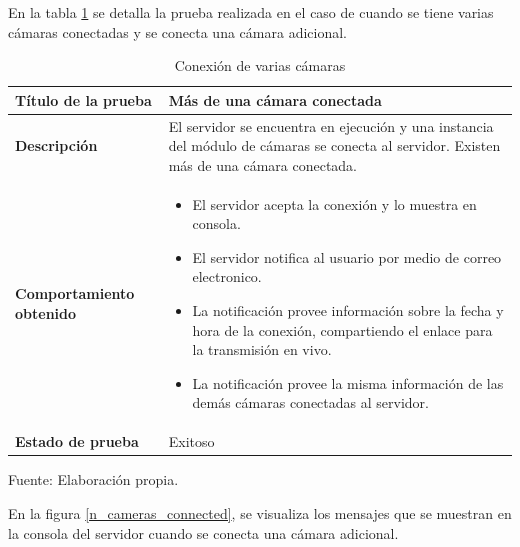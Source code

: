 En la tabla \ref{many_cameras_connected_table} se detalla la prueba realizada en el caso de cuando se tiene varias cámaras conectadas y se conecta una cámara adicional.\\

\begin{table}[H]
    \caption{Conexión de varias cámaras}
    \begin{center}
        \begin{tabular}{|>{\centering}p{}|m{}<{\centering}|} 
            \hline
            \textbf{Título de la prueba} & \textbf{ Más de una cámara conectada} \\
            \hline
            \textbf{Descripción} & El servidor se encuentra en ejecución y una instancia del módulo de cámaras se conecta al servidor. Existen más de una cámara conectada.\\
            \hline
            \textbf{Comportamiento obtenido} & 
            \begin{itemize}
                \item El servidor acepta la conexión y lo muestra en consola.
                \item El servidor notifica al usuario por medio de correo electronico.
                \item La notificación provee información sobre la fecha y hora de la conexión, compartiendo el enlace para la transmisión en vivo.
                \item La notificación provee la misma información de las demás cámaras conectadas al servidor.
            \end{itemize} \\ 
            \hline
            \textbf{Estado de prueba} & Exitoso \\
            \hline
        \end{tabular}
        \label{many_cameras_connected_table}
        \begin{center}
            Fuente: Elaboración propia.
        \end{center}
    \end{center}
\end{table}

En la figura \ref{n_cameras_connected}, se visualiza los mensajes que se muestran en la consola del servidor cuando se conecta una cámara adicional.

